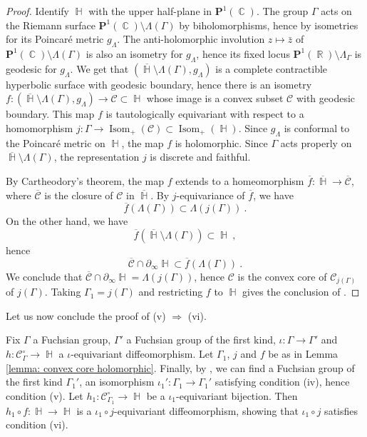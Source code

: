 \documentclass{amsart}
\theoremstyle{plain}
\theoremstyle{definition}
\DeclareMathOperator{\Isom}{Isom}
\DeclareMathOperator{\Cb}{\mathbb{C}}
\DeclareMathOperator{\Hb}{\mathbb{H}}
\DeclareMathOperator{\Rb}{{\mathbb{R}}}
\newcommand{\1}{\mathbf{1}}
\begin{document}
\begin{proof}
    Identify $\Hb$ with the upper half-plane in $\mathbf{P}^1(\Cb)$. The group $\Gamma$ acts on the Riemann surface $\mathbf{P}^1(\Cb) \setminus \Lambda(\Gamma)$ by biholomorphisms, hence by isometries for its Poincaré metric $g_\Lambda$. The anti-holomorphic involution $z\mapsto \bar z$ of $\mathbf{P}^1(\Cb) \setminus \Lambda(\Gamma)$ is also an isometry for $g_\Lambda$, hence its fixed locus $\mathbf{P}^1(\Rb)\setminus \Lambda_\Gamma$ is geodesic for $g_\Lambda$. We get that  $(\overline{\Hb}\setminus \Lambda(\Gamma), g_\Lambda)$ is a complete contractible hyperbolic surface with geodesic boundary, hence there is an isometry $f:(\overline{\Hb}\setminus \Lambda(\Gamma), g_\Lambda) \to \mathcal C \subset \Hb$ whose image is a convex subset $\mathcal C$ with geodesic boundary. This map $f$ is tautologically equivariant with respect to a homomorphism $j: \Gamma \to \Isom_+(\mathcal C) \subset \Isom_+(\Hb)$. Since $g_\Lambda$ is conformal to the Poincar\'e metric on $\Hb$, the map $f$ is holomorphic. Since $\Gamma$ acts properly on $\overline{\Hb}\setminus \Lambda(\Gamma)$, the representation $j$ is discrete and faithful.

    By Cartheodory's theorem, the map $f$ extends to a homeomorphism $\overline{f} : \overline{\Hb} \to \overline{\mathcal C}$, where $\overline{\mathcal C}$ is the closure of $\mathcal C$ in $\overline{\Hb}$. By $j$-equivariance of $\overline{f}$, we have
    \[\overline{f}(\Lambda(\Gamma)) \subset \Lambda(j(\Gamma))~.\]
    On the other hand, we have
    \[\overline{f}(\overline{\Hb} \setminus \Lambda(\Gamma)) \subset \Hb~,\]
    hence
    \[\overline{\mathcal C} \cap \partial_\infty \Hb \subset \overline{f}(\Lambda(\Gamma))~. \]
    We conclude that $\overline{\mathcal C} \cap \partial_\infty \Hb = \Lambda(j(\Gamma))$, hence $\mathcal C$ is the convex core of $\mathcal C_{j(\Gamma)}$ of $j(\Gamma)$.
    Taking $\Gamma_1 = j(\Gamma)$ and restricting $f$ to $\Hb$ gives the conclusion of .     
\end{proof}

Let us now conclude the proof of (v) $\Rightarrow$ (vi). 

Fix $\Gamma$ a Fuchsian group, $\Gamma'$ a Fuchsian group of the first kind, $\iota\colon\Gamma \to \Gamma'$ and $h\colon \mathcal C^\circ_\Gamma \to \Hb$ a $\iota$-equivariant diffeomorphism. Let $\Gamma_1$, $j$ and $f$ be as in Lemma \ref{lemma: convex core holomorphic}. Finally, by , we can find a Fuchsian group of the first kind $\Gamma_1'$, an isomorphism $\iota_1'\colon\Gamma_1 \to \Gamma_1'$ satisfying condition (iv), hence condition (v). Let $h_1\colon \mathcal C^\circ_{\Gamma_1} \to \Hb$ be a $\iota_1$-equivariant bijection. Then $h_1\circ f\colon\Hb \to \Hb$ is a $\iota_1 \circ j$-equivariant diffeomorphism, showing that $\iota_1 \circ j$ satisfies condition (vi).
\end{document}

